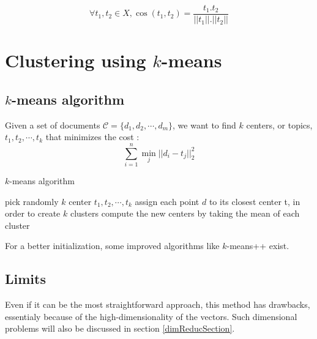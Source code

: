 \documentclass[a4paper,twoside,12pt,openright]{report}
\begin{document}
$$ \forall t_1,t_2 \in X, \cos(t_1,t_2) = \frac{t_1.t_2}{||t_1||.||t_2||} $$

\newpage
\section{Clustering using $k$-means}

\subsection{$k$-means algorithm}
Given a set of documents $\mathcal{C} = \{d_1,d_2,\cdots,d_m\}$, we want to find $k$ centers, or topics, $t_1,t_2,\cdots,t_k$ that minimizes the cost :
$$ \sum_{i=1}^n \min_j ||d_i-t_j||_2^2 $$


\begin{algorithm}
\caption{$k$-means algorithm}
\label{algo:kmeans}
\begin{algorithmic} 
\STATE pick randomly $k$ center ${t_1,t_2,\cdots,t_k}$
\REPEAT
\STATE assign each point $d$ to its closest center t, in order to create $k$ clusters
\STATE compute the new centers by taking the mean of each cluster
\end{algorithmic}
\end{algorithm}

For a better initialization, some improved algorithms like $k$-means++ exist.

\subsection{Limits}
Even if it can be the most straightforward approach, this method has drawbacks, essentialy because of the high-dimensionality of the vectors. Such dimensional problems will also be discussed in section \ref{dimReducSection}.


\newpage 
\end{document}

